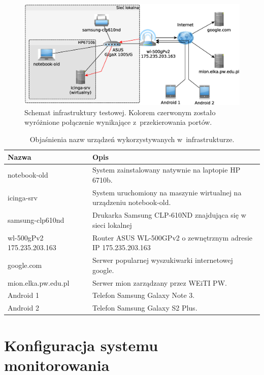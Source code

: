 \begin{figure}[ht]
  \caption{Schemat infrastruktury testowej. Kolorem czerwonym zostało
    wyróżnione połączenie wynikające z~przekierowania portów.}
  \label{fig:schematSieci}
  \centering
\includegraphics[width=1\textwidth]{img/schematSieci}
\end{figure}

\begin{table}
\centering
\caption{Objaśnienia nazw urządzeń wykorzystywanych w~infrastrukturze.}
\label{tab:devices}
\begin{tabular}{|p{4cm}||p{10cm}|}
\hline
Nazwa & Opis \\
\hline \hline
notebook-old & System zainstalowany natywnie na laptopie HP 6710b. \\
\hline
icinga-srv & System uruchomiony na maszynie wirtualnej na urządzeniu notebook-old. \\
\hline
samsung-clp610nd & Drukarka Samsung CLP-610ND znajdująca się w sieci lokalnej \\
\hline
\raggedright{wl-500gPv2 175.235.203.163} & \raggedright{Router ASUS WL-500GPv2 o zewnętrznym adresie IP 175.235.203.163}
\tabularnewline
\hline
google.com & Serwer popularnej wyszukiwarki internetowej google. \\
\hline
mion.elka.pw.edu.pl & Serwer mion zarządzany przez WEiTI PW. \\
\hline
Android 1 & Telefon Samsung Galaxy Note 3. \\
\hline
Android 2 & Telefon Samsung Galaxy S2 Plus. \\
\hline
\end{tabular}
\end{table}

\section[Konfiguracja systemu monitorowania][Konfiguracja systemu
monitorowania]{Konfiguracja systemu monitorowania}

